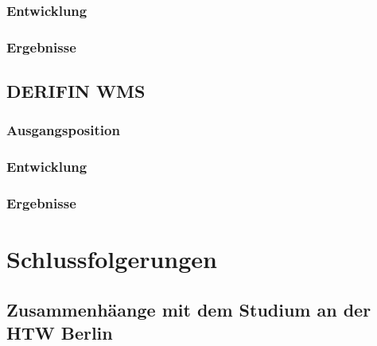 \documentclass{article}
\begin{document}
    \subsubsection{Entwicklung}

    \subsubsection{Ergebnisse}

    \subsection{DERIFIN WMS}

    \subsubsection{Ausgangsposition}

    \subsubsection{Entwicklung}

    \subsubsection{Ergebnisse}

    \section{Schlussfolgerungen}

    \subsection{Zusammenhäange mit dem Studium an der HTW Berlin}
\end{document}
